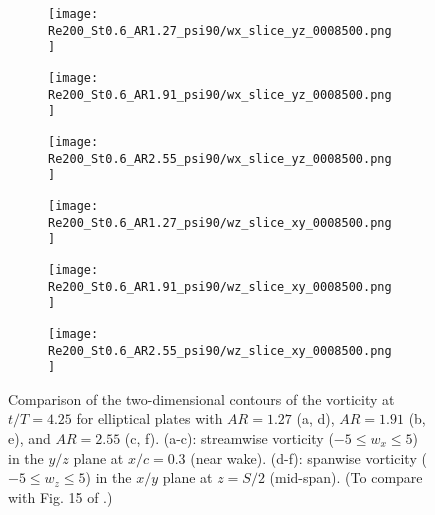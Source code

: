 \begin{figure}[!h]
  \centering
  \begin{subfigure}[c]{0.2\textwidth}
    \centering
    \texttt{[image: Re200\_St0.6\_AR1.27\_psi90/wx\_slice\_yz\_0008500.png]}
    \caption{}
    \label{fig:ratio_vorticity_slices:1.27_wx}
  \end{subfigure}
  \hspace{3em}
  \begin{subfigure}[c]{0.2\textwidth}
    \centering
    \texttt{[image: Re200\_St0.6\_AR1.91\_psi90/wx\_slice\_yz\_0008500.png]}
    \caption{}
    \label{fig:ratio_vorticity_slices:1.91_wx}
  \end{subfigure}
  \hspace{3em}
  \begin{subfigure}[c]{0.23\textwidth}
    \centering
    \texttt{[image: Re200\_St0.6\_AR2.55\_psi90/wx\_slice\_yz\_0008500.png]}
    \caption{}
    \label{fig:ratio_vorticity_slices:2.55_wx}
  \end{subfigure}
  \vspace{0.5em}
  \begin{subfigure}[c]{0.32\textwidth}
    \centering
    \texttt{[image: Re200\_St0.6\_AR1.27\_psi90/wz\_slice\_xy\_0008500.png]}
    \caption{}
    \label{fig:ratio_vorticity_slices:1.27_wz}
  \end{subfigure}
  \hspace{0.2em}
  \begin{subfigure}[c]{0.32\textwidth}
    \centering
    \texttt{[image: Re200\_St0.6\_AR1.91\_psi90/wz\_slice\_xy\_0008500.png]}
    \caption{}
    \label{fig:ratio_vorticity_slices:1.91_wz}
  \end{subfigure}
  \hspace{0.2em}
  \begin{subfigure}[c]{0.32\textwidth}
    \centering
    \texttt{[image: Re200\_St0.6\_AR2.55\_psi90/wz\_slice\_xy\_0008500.png]}
    \caption{}
    \label{fig:ratio_vorticity_slices:2.55_wz}
  \end{subfigure}
  \caption{Comparison of the two-dimensional contours of the vorticity at $t/T = 4.25$ for elliptical plates with $AR = 1.27$ (a, d), $AR = 1.91$ (b, e), and $AR = 2.55$ (c, f). (a-c): streamwise vorticity ($-5 \leq w_x \leq 5$) in the $y/z$ plane at $x/c = 0.3$ (near wake). (d-f): spanwise vorticity ($-5 \leq w_z \leq 5$) in the $x/y$ plane at $z = S/2$ (mid-span). (To compare with Fig. 15 of \citet{li_dong_2016}.)}
  \label{fig:ratio_vorticity_slices}
\end{figure}

